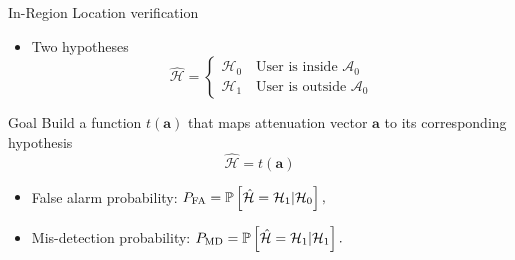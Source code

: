 \documentclass[10pt]{beamer}
\newcommand{\pr}[1]{\mathbb{P} \left[ #1 \right]}
\begin{document}
\begin{frame}{In-Region Location verification}
\begin{itemize}
	\item Two hypotheses
	\begin{equation*}
	\hat{\mathcal{H}} = 
	\begin{cases}
	\mathcal{H}_0 \quad \text{User is inside } \mathcal{A}_0 \\
	\mathcal{H}_1 \quad \text{User is outside } \mathcal{A}_0
	\end{cases}
	\end{equation*}
\end{itemize}
	\begin{block}{Goal}
		Build a function $t(\bm{a})$ that maps attenuation vector $\bm a$ to its corresponding hypothesis
		\begin{equation*}
		\hat{\mathcal{H}} = t(\bm{a}) 
		\end{equation*}
	\end{block}
\begin{itemize}
	\item False alarm probability:
	$
	P_{\rm FA} =\pr{\hat{\mathcal{H}} =\mathcal{H}_1 | \mathcal H_0},
	$
	\item Mis-detection probability:
	$
	P_{\rm MD}=\pr{\hat{\mathcal{H}} =\mathcal{H}_1 | \mathcal H_1}. 
	$
\end{itemize}
\end{frame}
\end{document}
